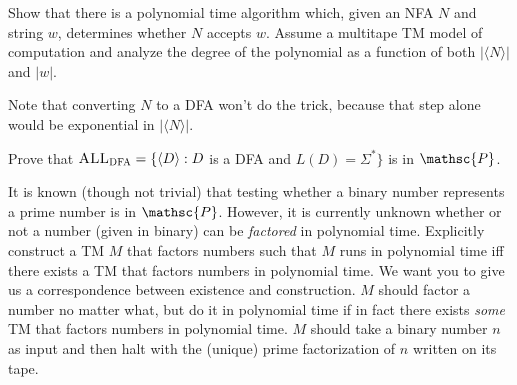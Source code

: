 \documentclass[letterpaper, ps]{cs121}
\begin{document}
Show that there is a polynomial time algorithm which, given an NFA $N$ and string $w$, determines whether $N$ accepts $w$. Assume a multitape TM model of computation and analyze the degree of the polynomial as a function of both $|\langle N\rangle|$ and $|w|$.

Note that converting $N$ to a DFA won't do the trick, because that step alone would be exponential in $|\langle N \rangle|$.


 Prove that $\textsc{ALL}_\textsc{DFA} = \{\langle D
\rangle : D$ is a DFA and $L(D)=\Sigma^*\}$ is in $\mathsc{P}$.


 It is known (though not trivial) that testing whether a binary number represents a prime number is in $\mathsc{P}$. However, it is currently unknown whether or not a number (given in binary) can be \textit{factored} in polynomial time. Explicitly construct a TM $M$ that factors numbers such that $M$ runs in polynomial time iff there exists a TM that factors numbers in polynomial time. We want you to give us a correspondence between existence and construction. $M$ should factor a number no matter what, but do it in polynomial time if in fact there exists \emph{some} TM that factors numbers in polynomial time. $M$ should take a binary number $n$ as input and then halt with the (unique) prime factorization of $n$ written on its tape.

\end{document}
